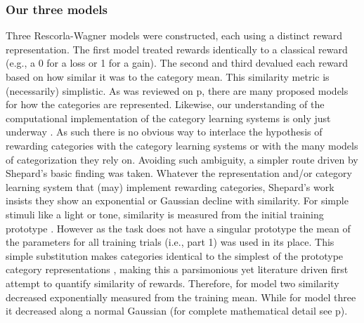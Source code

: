 \subsubsection{Our three models}
\label{subsub:catquant}
Three Rescorla-Wagner models were constructed, each using a distinct reward representation.  The first model treated rewards identically to a classical reward (e.g., a 0 for a loss or 1 for a gain).  The second and third devalued each reward based on how similar it was to the category mean.  This similarity metric is (necessarily) simplistic.  As was reviewed on p\pageref{subsub:curves}, there are many proposed models for how the categories are represented.  Likewise, our understanding of the computational implementation of the category learning systems is only just underway \cite{Ashby:2005p9152,Ashby:2006p9153}.  As such there is no obvious way to interlace the hypothesis of rewarding categories with the category learning systems or with the many models of categorization they rely on.  Avoiding such ambiguity, a simpler route driven by Shepard's basic finding \cite{Shepard:1987p9102} was taken.  Whatever the representation and/or category learning system that (may) implement rewarding categories, Shepard's work insists they show an exponential or Gaussian decline with similarity.  For simple stimuli like a light or tone, similarity is measured from the initial training prototype \cite{Guttman:1956p8355}.  However as the task does not have a singular prototype the mean of the parameters for all training trials (i.e., part 1) was used in its place.  This simple substitution makes categories identical to the simplest of the prototype category representations \cite{Rosch:1973p9108,Ashby:1995p9109}, making this a parsimonious yet literature driven first attempt to quantify similarity of rewards.  Therefore, for model two similarity decreased exponentially measured from the training mean.  While for model three it decreased along a normal Gaussian (for complete mathematical detail see p\pageref{subsub:codesandfits}).  

